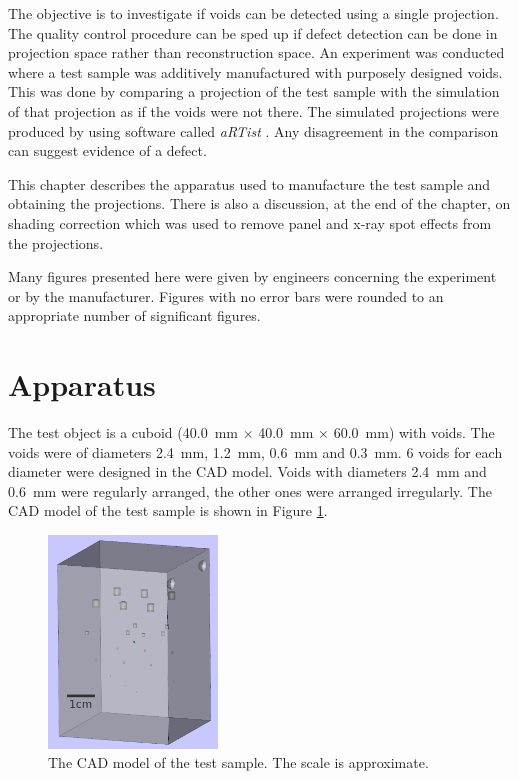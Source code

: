 The objective is to investigate if voids can be detected using a single projection. The quality control procedure can be sped up if defect detection can be done in projection space rather than reconstruction space. An experiment was conducted where a test sample was additively manufactured with purposely designed voids. This was done by comparing a projection of the test sample with the simulation of that projection as if the voids were not there. The simulated projections were produced by using software called \emph{aRTist} \citep{bellon2007artist, jaenisch2008artist, bellon2012radiographic}. Any disagreement in the comparison can suggest evidence of a defect.

This chapter describes the apparatus used to manufacture the test sample and obtaining the projections. There is also a discussion, at the end of the chapter, on shading correction which was used to remove panel and x-ray spot effects from the projections.

Many figures presented here were given by engineers concerning the experiment or by the manufacturer. Figures with no error bars were rounded to an appropriate number of significant figures.

\section{Apparatus}

The test object is a cuboid (\SI{40.0}{\milli\metre} $\times$ \SI{40.0}{\milli\metre} $\times$ \SI{60.0}{\milli\metre}) with voids. The voids were of diameters \SI{2.4}{\milli\metre}, \SI{1.2}{\milli\metre}, \SI{0.6}{\milli\metre} and \SI{0.3}{\milli\metre}. 6 voids for each diameter were designed in the CAD model. Voids with diameters \SI{2.4}{\milli\metre} and \SI{0.6}{\milli\metre} were regularly arranged, the other ones were arranged irregularly. The CAD model of the test sample is shown in Figure \ref{fig:inference_testObject}.

\begin{figure}
  \centering
  \includegraphics[width=0.4\textwidth]{../figures/inference/TestObject.png}
  \caption{The CAD model of the test sample. The scale is approximate.}
  \label{fig:inference_testObject}
\end{figure}

